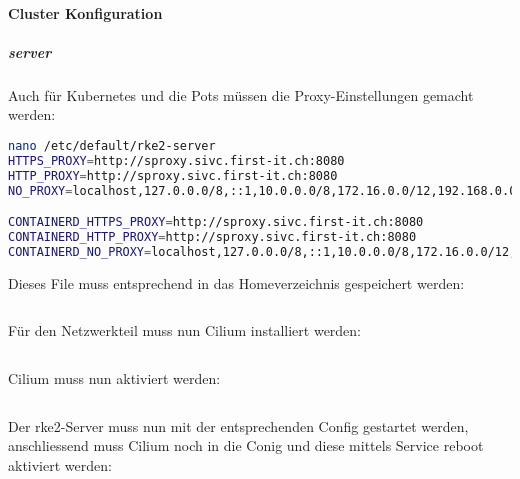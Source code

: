 \paragraph{Cluster Konfiguration}
\subparagraph{server}
Auch für Kubernetes und die Pots müssen die Proxy-Einstellungen gemacht werden:
\lstset{style=gra_codestyle}
\begin{lstlisting}[language=bash, caption=rke2 server proxy,captionpos=b,label={lst:rke2-server-proxy},breaklines=true]
nano /etc/default/rke2-server
HTTPS_PROXY=http://sproxy.sivc.first-it.ch:8080
HTTP_PROXY=http://sproxy.sivc.first-it.ch:8080
NO_PROXY=localhost,127.0.0.0/8,::1,10.0.0.0/8,172.16.0.0/12,192.168.0.0/16

CONTAINERD_HTTPS_PROXY=http://sproxy.sivc.first-it.ch:8080
CONTAINERD_HTTP_PROXY=http://sproxy.sivc.first-it.ch:8080
CONTAINERD_NO_PROXY=localhost,127.0.0.0/8,::1,10.0.0.0/8,172.16.0.0/12,192.168.0.0/16
\end{lstlisting}

Dieses File muss entsprechend in das Homeverzeichnis gespeichert werden:
\lstset{style=gra_codestyle}
\begin{lstlisting}[language=bash, caption=rke2 server proxy kopieren,captionpos=b,label={lst:rke2-server-proxy-copy},breaklines=true]

\end{lstlisting}

Für den Netzwerkteil muss nun Cilium installiert werden:
\lstset{style=gra_codestyle}
\begin{lstlisting}[language=bash, caption=rke2 server cilium installieren,captionpos=b,label={lst:rke2-server-cilium-install},breaklines=true]

\end{lstlisting}

Cilium muss nun aktiviert werden:
\begin{lstlisting}[language=bash, caption=rke2 server cilium aktivieren,captionpos=b,label={lst:rke2-server-cilium-apply},breaklines=true]

\end{lstlisting}

Der rke2-Server muss nun mit der entsprechenden Config gestartet werden, anschliessend muss Cilium noch in die Conig und diese mittels Service reboot aktiviert werden:
\lstset{style=gra_codestyle}
\begin{lstlisting}[language=bash, caption=rke2 server starten,captionpos=b,label={lst:rke2-server-start},breaklines=true]

\end{lstlisting}

